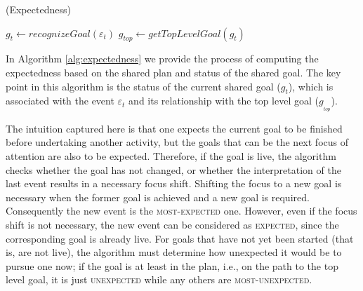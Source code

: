\documentclass[12pt]{report}
\begin{document}
\begin{algorithm}
	\caption{(Expectedness)}
	\label{alg:expectedness}
	\begin{algorithmic}[1]
			\Statex
			\State $\mathit{g}_{t} \gets \textit{recognizeGoal}{(\varepsilon_t)}$
			\State $\mathit{g}_{top} \gets \textit{getTopLevelGoal}{(\mathit{g}_{t})}$
			\Statex
				\State {}
				\Else
					\State {}
				\EndIf
			\Else
					\State {}
				\Else
					\State {}
				\EndIf
			\EndIf
		\EndFunction
	\end{algorithmic}
\end{algorithm}

In Algorithm \ref{alg:expectedness} we provide the process of computing the
expectedness based on the shared plan and status of the shared goal. The key
point in this algorithm is the status of the current shared goal
($\mathit{g}_{t}$), which is associated with the event $\varepsilon_t$ and its
relationship with the top level goal ($\mathit{g}_{_{top}}$).

The intuition captured here is that one expects the current goal to be finished
before undertaking another activity, but the goals that can be the next focus of
attention are also to be expected. Therefore, if the goal is live, the algorithm
checks whether the goal has not changed, or whether the interpretation of the
last event results in a necessary focus shift. Shifting the focus to a new goal
is necessary when the former goal is achieved and a new goal is required.
Consequently the new event is the \textsc{most-expected} one. However, even if
the focus shift is not necessary, the new event can be considered as
\textsc{expected}, since the corresponding goal is already live. For goals that
have not yet been started (that is, are not live), the algorithm must determine
how unexpected it would be to pursue one now; if the goal is at least in the
plan, i.e., on the path to the top level goal, it is just \textsc{unexpected}
while any others are \textsc{most-unexpected}.
\end{document}
